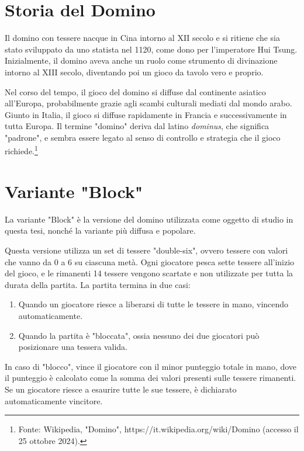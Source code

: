 \documentclass[a4paper.12pt]{report} %
\begin{document}
\section{Storia del Domino}

Il domino con tessere nacque in Cina intorno al XII secolo e si ritiene che sia stato sviluppato da uno statista nel 1120, come dono per l'imperatore Hui Tsung. Inizialmente, il domino aveva anche un ruolo come strumento di divinazione intorno al XIII secolo, diventando poi un gioco da tavolo vero e proprio.

Nel corso del tempo, il gioco del domino si diffuse dal continente asiatico all'Europa, probabilmente grazie agli scambi culturali mediati dal mondo arabo. Giunto in Italia, il gioco si diffuse rapidamente in Francia e successivamente in tutta Europa. Il termine "domino" deriva dal latino \textit{dominus}, che significa "padrone", e sembra essere legato al senso di controllo e strategia che il gioco richiede.\footnote{Fonte: Wikipedia, "Domino", https://it.wikipedia.org/wiki/Domino (accesso il 25 ottobre 2024).}

\section{Variante "Block"}

La variante "Block" è la versione del domino utilizzata come oggetto di studio in questa tesi, nonché la variante più diffusa e popolare.

Questa versione utilizza un set di tessere "double-six", ovvero tessere con valori che vanno da 0 a 6 su ciascuna metà. Ogni giocatore pesca sette tessere all'inizio del gioco, e le rimanenti 14 tessere vengono scartate e non utilizzate per tutta la durata della partita. La partita termina in due casi:

\begin{enumerate}
    \item Quando un giocatore riesce a liberarsi di tutte le tessere in mano, vincendo automaticamente.
    \item Quando la partita è "bloccata", ossia nessuno dei due giocatori può posizionare una tessera valida.
\end{enumerate}

In caso di "blocco", vince il giocatore con il minor punteggio totale in mano, dove il punteggio è calcolato come la somma dei valori presenti sulle tessere rimanenti. Se un giocatore riesce a esaurire tutte le sue tessere, è dichiarato automaticamente vincitore.
\end{document}
